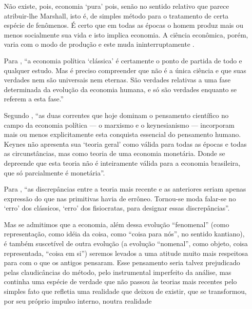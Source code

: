 \documentclass[
	10pt,				%
	openright,			%
	twoside,			%
	a5paper,			%
	english,			%
	french,				%
	spanish,			%
	brazil				%
	]{abntex2}
\renewenvironment{quote}
  {\small\list{}{\rightmargin=0.1cm \leftmargin=4cm}%
   \item\relax}
  {\endlist}
\begin{document}
\begin{quote}
Não existe, pois, economia `pura' pois, senão no sentido relativo que
parece atribuir-lhe Marshall, isto é, de simples método para o
tratamento de certa espécie de fenômenos. É certo que em todas as épocas
o homem produz mais ou menos socialmente sua vida e isto implica
economia. A ciência econômica, porém, varia com o modo de produção e
este muda ininterruptamente \cite[p.~287-288]{rangel1957}.
\end{quote}

Para , ``a economia política `clássica' é
certamente o ponto de partida de todo e qualquer estudo. Mas é preciso
compreender que não é a única ciência e que suas verdades nem são
universais nem eternas. São verdades relativas a uma fase determinada da
evolução da economia humana, e só são verdades enquanto se referem a
esta fase.''

Segundo , ``as duas correntes que hoje
dominam o pensamento científico no campo da economia política --- o
marxismo e o keynesianismo --- incorporam mais ou menos explicitamente
esta conquista essencial do pensamento humano. Keynes não apresenta sua
`teoria geral' como válida para todas as épocas e todas as
circunstâncias, mas como teoria de uma economia monetária. Donde se
depreende que esta teoria não é inteiramente válida para a economia
brasileira, que só parcialmente é monetária''.

Para , ``as discrepâncias entre a teoria
mais recente e as anteriores seriam apenas expressão do que nas
primitivas havia de errôneo. Tornou-se moda falar-se no `erro' dos
clássicos, `erro' dos fisiocratas, para designar essas discrepâncias''.

\begin{quote}
Mas se admitimos que a economia, além dessa evolução ``fenomenal'' (como
representação, como idéia da coisa, como ``coisa para nós'', no sentido
kantiano), é também suscetível de outra evolução (a evolução
``nomenal'', como objeto, coisa representada, ``coisa em si'') seremos
levados a uma atitude muito mais respeitosa para com o que os antigos
pensaram. Esse pensamento seria talvez prejudicado pelas claudicâncias
do método, pelo instrumental imperfeito da análise, mas continha uma
espécie de verdade que não passou às teorias mais recentes pelo simples
fato que refletia uma realidade que deixou de existir, que se
transformou, por seu próprio impulso interno, noutra realidade
\cite[p.~205]{rangel1956}
\end{quote}
\end{document}
